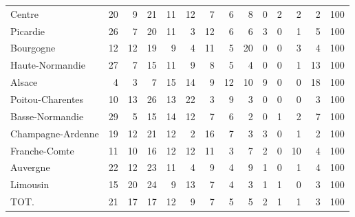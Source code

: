 \documentclass[11pt]{article}
\begin{document}
\begin{table}[H]
\begin{tabular}{lrrrrrrrrrrrrr}
Centre               &         20 &          9 &         21 &         11 &         12 &          7 &          6 &          8 &          0 &          2 &          2 &          2 &        100 \\
Picardie             &         26 &          7 &         20 &         11 &          3 &         12 &          6 &          6 &          3 &          0 &          1 &          5 &        100 \\
Bourgogne            &         12 &         12 &         19 &          9 &          4 &         11 &          5 &         20 &          0 &          0 &          3 &          4 &        100 \\
Haute-Normandie      &         27 &          7 &         15 &         11 &          9 &          8 &          5 &          4 &          0 &          0 &          1 &         13 &        100 \\
Alsace               &          4 &          3 &          7 &         15 &         14 &          9 &         12 &         10 &          9 &          0 &          0 &         18 &        100 \\
Poitou-Charentes     &         10 &         13 &         26 &         13 &         22 &          3 &          9 &          3 &          0 &          0 &          0 &          3 &        100 \\
Basse-Normandie      &         29 &          5 &         15 &         14 &         12 &          7 &          6 &          2 &          0 &          1 &          2 &          7 &        100 \\
Champagne-Ardenne    &         19 &         12 &         21 &         12 &          2 &         16 &          7 &          3 &          3 &          0 &          1 &          2 &        100 \\
Franche-Comte        &         11 &         10 &         16 &         12 &         12 &         11 &          3 &          7 &          2 &          0 &         10 &          4 &        100 \\
Auvergne             &         22 &         12 &         23 &         11 &          4 &          9 &          4 &          9 &          1 &          0 &          1 &          4 &        100 \\
Limousin             &         15 &         20 &         24 &          9 &         13 &          7 &          4 &          3 &          1 &          1 &          0 &          3 &        100 \\
TOT.                 &         21 &         17 &         17 &         12 &          9 &          7 &          5 &          5 &          2 &          1 &          1 &          3 &        100 \\
\bottomrule
\end{tabular}

\end{table}
\end{document}
